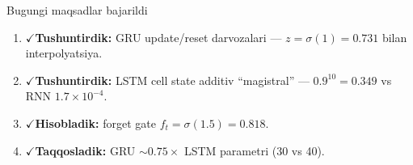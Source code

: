 \documentclass[aspectratio=169,11pt]{beamer}
\newcommand{\bajarildi}{{\color{deepgreen}\large$\checkmark$}\;}
\begin{document}
\begin{frame}{Bugungi maqsadlar bajarildi}
  \begin{enumerate}\setlength\itemsep{7pt}
    \item \bajarildi \textbf{Tushuntirdik:} GRU update/reset darvozalari ---
          $z=\sigma(1)=0.731$ bilan interpolyatsiya.
    \item \bajarildi \textbf{Tushuntirdik:} LSTM cell state additiv ``magistral'' ---
          $0.9^{10}=0.349$ vs RNN $1.7{\times}10^{-4}$.
    \item \bajarildi \textbf{Hisobladik:} forget gate $f_t=\sigma(1.5)=0.818$.
    \item \bajarildi \textbf{Taqqosladik:} GRU $\sim 0.75\times$ LSTM parametri
          (30 vs 40).
  \end{enumerate}
\end{frame}
\end{document}
